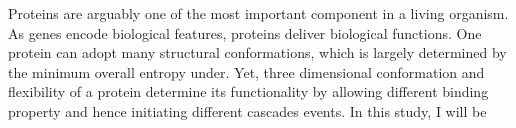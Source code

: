 Proteins are arguably one of the most important component in a living organism. As genes encode biological features, proteins deliver biological functions. One protein can adopt many structural conformations, which is largely determined by the minimum overall entropy under. Yet, three dimensional conformation and flexibility of a protein determine its functionality by allowing different binding property and hence initiating different cascades events. In this study, I will be 
